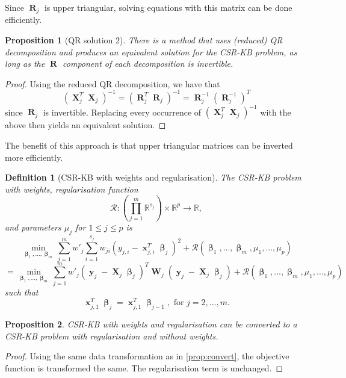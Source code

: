 \documentclass[12pt]{article}
\DeclareMathOperator{\bx}{\mathbf{x}}
\DeclareMathOperator{\bX}{\mathbf{X}}
\DeclareMathOperator{\by}{\mathbf{y}}
\DeclareMathOperator{\bW}{\mathbf{W}}
\DeclareMathOperator{\bR}{\mathbf{R}}
\DeclareMathOperator{\bbeta}{\boldsymbol{\beta}}
\newtheorem{defn}{Definition}
\newtheorem{prop}{Proposition}
\begin{document}
Since $\bR_j$ is upper triangular, solving equations with this matrix can be done efficiently.

\begin{prop}[QR solution 2] There is a method that uses (reduced) QR decomposition and produces an equivalent solution for the CSR-KB problem, as long as the $\bR$ component of each decomposition is invertible.
\end{prop}

\begin{proof}
Using the reduced QR decomposition, we have that 
$$(\bX_j^T \bX_j)^{-1} = (\bR_j^T \bR_j)^{-1} = \bR_j^{-1} (\bR_j^{-1})^T$$
since $\bR_j$ is invertible. Replacing every occurrence of $(\bX_j^T \bX_j)^{-1}$ with the above then yields an equivalent solution.
\end{proof}

The benefit of this approach is that upper triangular matrices can be inverted more efficiently.

\begin{defn}[CSR-KB with weights and regularisation]
The CSR-KB problem with weights, regularisation function 
$$\mathcal{R} : \left(\prod_{j=1}^m \mathbb{R}^{s_j} \right) \times \mathbb{R}^p \to \mathbb{R},$$
and parameters $\mu_j$ for $1 \leq j \leq p$ is
$$\min_{\bbeta_1,...,\bbeta_m} \sum_{j=1}^m w'_j\sum_{i=1}^{s_j} w_{ji}(y_{j, i}-\bx_{j, i}^T\bbeta_j)^2+\mathcal{R}(\bbeta_1, ..., \bbeta_m, \mu_1, ..., \mu_p)$$
$$= \min_{\bbeta_1,...,\bbeta_m} \sum_{j=1}^m w'_j (\by_j-\bX_j\bbeta_j)^T\bW_j(\by_j-\bX_j\bbeta_j)+\mathcal{R}(\bbeta_1, ..., \bbeta_m, \mu_1, ..., \mu_p)$$
such that
$$\bx_{j, 1}^T \bbeta_j = \bx_{j, 1}^T \bbeta_{j-1}, \text{ for }j=2, ..., m.$$
\end{defn}
\begin{prop}
CSR-KB with weights and regularisation can be converted to a CSR-KB problem with regularisation and without weights.
\end{prop}
\begin{proof}
Using the same data transformation as in \ref{prop:convert}, the objective function is transformed the same. The regularisation term is unchanged.
\end{proof}
\end{document}
